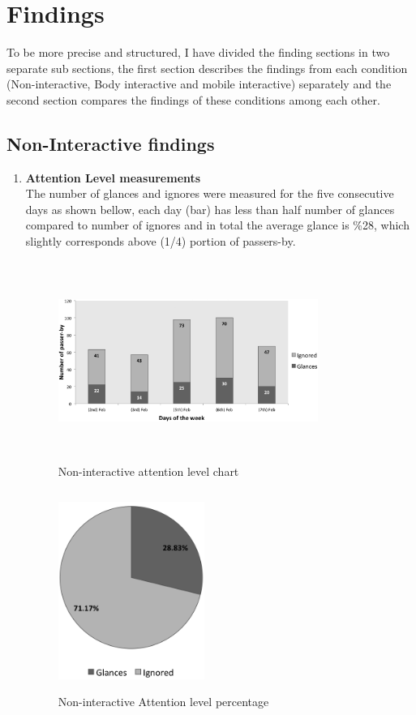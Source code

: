 \section{Findings}
To be more precise and structured, I have divided the finding sections in two separate sub sections, the first section describes the findings from each condition (Non-interactive, Body interactive and mobile interactive) separately and the second section compares the findings of these conditions among each other.


\subsection{Non-Interactive findings}

\begin{enumerate}

\item \textbf{Attention Level measurements} \\
The number of glances and ignores were measured for the five consecutive days as shown bellow, each day (bar) has less than half number of glances compared to number of ignores and in total the average glance is \%28, which slightly corresponds above (1/4) portion of passers-by.


\begin{figure}[H]
    \centering
    \includegraphics[width=0.8\textwidth,height=6.5cm]{Figures/8/non_inter_findings/Non_Inter_chart}%
    \caption{Non-interactive attention level chart}%
    \label{fig:Nonattentionlevelchart}%
\end{figure}


\begin{figure}[H]
    \centering
    \includegraphics[width=0.45\textwidth,height=6.5cm]{Figures/8/non_inter_findings/non_inter_percentage}
    \caption{Non-interactive Attention level percentage}%
    \label{fig:Nonattentionlevelpercentage}%
\end{figure}




\end{enumerate}
